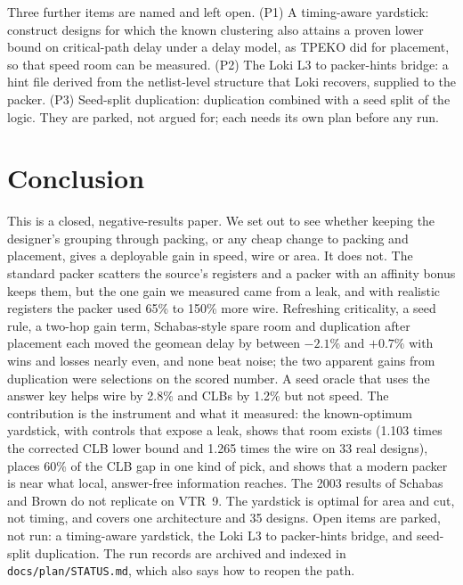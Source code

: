 Three further items are named and left open. (P1) A timing-aware yardstick: construct designs for which the known clustering also attains a proven lower bound on critical-path delay under a delay model, as TPEKO did for placement, so that speed room can be measured. (P2) The Loki L3 to packer-hints bridge: a hint file derived from the netlist-level structure that Loki recovers, supplied to the packer. (P3) Seed-split duplication: duplication combined with a seed split of the logic. They are parked, not argued for; each needs its own plan before any run.

\section{Conclusion}
\label{sec:conclusion}

This is a closed, negative-results paper. We set out to see whether keeping the designer's grouping through packing, or any cheap change to packing and placement, gives a deployable gain in speed, wire or area. It does not. The standard packer scatters the source's registers and a packer with an affinity bonus keeps them, but the one gain we measured came from a leak, and with realistic registers the packer used 65\% to 150\% more wire. Refreshing criticality, a seed rule, a two-hop gain term, Schabas-style spare room and duplication after placement each moved the geomean delay by between $-2.1\%$ and $+0.7\%$ with wins and losses nearly even, and none beat noise; the two apparent gains from duplication were selections on the scored number. A seed oracle that uses the answer key helps wire by 2.8\% and CLBs by 1.2\% but not speed. The contribution is the instrument and what it measured: the known-optimum yardstick, with controls that expose a leak, shows that room exists (1.103 times the corrected CLB lower bound and 1.265 times the wire on 33 real designs), places 60\% of the CLB gap in one kind of pick, and shows that a modern packer is near what local, answer-free information reaches. The 2003 results of Schabas and Brown do not replicate on VTR~9. The yardstick is optimal for area and cut, not timing, and covers one architecture and 35 designs. Open items are parked, not run: a timing-aware yardstick, the Loki L3 to packer-hints bridge, and seed-split duplication. The run records are archived and indexed in \texttt{docs/plan/STATUS.md}, which also says how to reopen the path.
